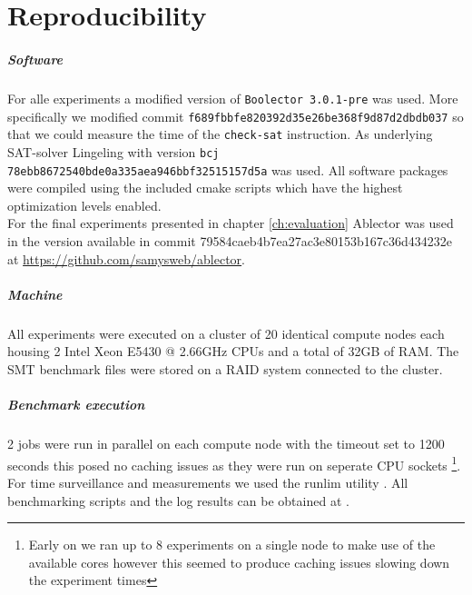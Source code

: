 
\chapter{Reproducibility}
\label{sec:appendix:reproducibility}
\paragraph{Software}
For alle experiments a modified version of \texttt{Boolector 3.0.1-pre} was used.
More specifically we modified commit \texttt{f689fbbfe820392d35e26be368f9d87d2dbdb037} so that we could measure the time of the \texttt{check-sat} instruction.
As underlying SAT-solver Lingeling with version \texttt{bcj 78ebb8672540bde0a335aea946bbf32515157d5a} was used.
All software packages were compiled using the included cmake scripts which have the highest optimization levels enabled.\\
For the final experiments presented in chapter \ref{ch:evaluation} Ablector was used in the version available in commit 79584caeb4b7ea27ac3e80153b167c36d434232e at \url{https://github.com/samysweb/ablector}.

\paragraph{Machine}
All experiments were executed on a cluster of 20 identical compute nodes each housing 2 Intel Xeon E5430 @ 2.66GHz CPUs and a total of 32GB of RAM.
The SMT benchmark files were stored on a RAID system connected to the cluster.

\paragraph{Benchmark execution}
2 jobs were run in parallel on each compute node with the timeout set to 1200 seconds
this posed no caching issues as they were run on seperate CPU sockets
\footnote{Early on we ran up to 8 experiments on a single node to make use of the available cores however this seemed to produce caching issues slowing down the experiment times}.
For time surveillance and measurements we used the runlim utility \cite{runlim}.
All benchmarking scripts and the log results can be obtained at .

\renewcommand{\simplechapterdelim}{.}
\listoffigures